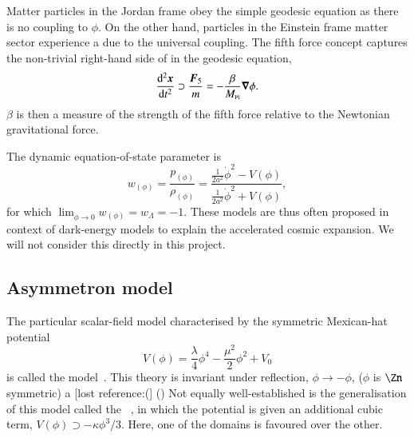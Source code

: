     Matter particles in the Jordan frame obey the simple geodesic equation as there is no coupling to $\phi$. On the other hand, particles in the Einstein frame matter sector experience a  due to the universal coupling. The fifth force concept captures the non-trivial right-hand side of in the geodesic equation, {
    \begin{equation}\label{eq:cosmo:quintessence:framework:fifth_force}
        \dv[2]{\ensuremath{\boldsymbol{x}}}{t} \supset \frac{\boldsymbol{F}_5}{m} = - \frac{\beta}{M_{\text{\tiny{Pl}}}} \boldsymbol{\nabla}\phi.
    \end{equation}}
    $\beta$ is then a measure of the strength of the fifth force relative to the Newtonian gravitational force.  



    The dynamic equation-of-state parameter is 
    \begin{equation}
        w_{(\phi)} =  \frac{p_{(\phi)}}{\rho_{(\phi)}}= \frac{\frac{1}{2a^2} \dot{\phi}^2 - V(\phi) }{\frac{1}{2a^2} \dot{\phi}^2 + V(\phi)},
    \end{equation}
    for which $\lim_{\dot{\phi}\to 0}{w_{(\phi)}}=w_\Lambda = -1$. %
    These models are thus often proposed in context of dark-energy models to explain the accelerated cosmic expansion. We will not consider this directly in this project.





    \subsection{Asymmetron model}\label{sec:cosmo:quintessence:asymmetron}
    The particular scalar-field model characterised by the symmetric Mexican-hat potential
    \begin{equation}
        V(\phi) = \frac{\lambda}{4} \phi^4  - \frac{\mu^2}{2} \phi^2 + V_0
    \end{equation}
    is called the  model~\citep{hinterbichlerSymmetronCosmology2011}. This theory is invariant under reflection, $\phi\to -\phi$, ($\phi$ is $\Zn$ symmetric) a [lost reference:(] () %
    Not equally well-established is the generalisation of this model called the ~\citep{perivolaropoulosGravitationalTransitionsExplicitly2022}, in which the potential is given an additional cubic term, $V(\phi)\supset -\kappa\phi^3/3 $. Here, one of the domains is favoured over the other. 


